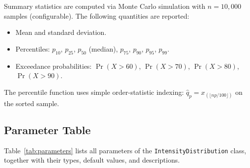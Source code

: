 \documentclass[11pt,a4paper]{article}
\begin{document}
Summary statistics are computed via Monte Carlo simulation with $n = 10{,}000$
samples (configurable). The following quantities are reported:

\begin{itemize}[nosep]
    \item Mean and standard deviation.
    \item Percentiles: $p_{10}$, $p_{25}$, $p_{50}$ (median), $p_{75}$, $p_{90}$, $p_{95}$, $p_{99}$.
    \item Exceedance probabilities: $\Pr(X > 60)$, $\Pr(X > 70)$, $\Pr(X > 80)$, $\Pr(X > 90)$.
\end{itemize}

\noindent The percentile function uses simple order-statistic indexing:
$\hat{q}_p = x_{(\lfloor np/100 \rfloor)}$ on the sorted sample.

\mkminputs

\subsection{Parameter Table}

Table~\ref{tab:parameters} lists all parameters of the \texttt{IntensityDistribution}
class, together with their types, default values, and descriptions.
\end{document}
